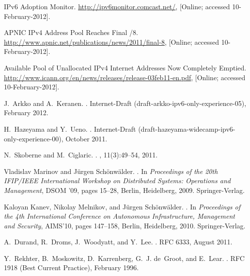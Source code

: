 \documentclass{llncs}
\begin{document}

\begin{thebibliography}{10}

{IPv6 Adoption Monitor}.
\newblock \url{http://ipv6monitor.comcast.net/}, [Online; accessed
  10-February-2012].

{APNIC IPv4 Address Pool Reaches Final /8}.
\newblock \url{http://www.apnic.net/publications/news/2011/final-8}, [Online;
  accessed 10-February-2012].

{Available Pool of Unallocated IPv4 Internet Addresses Now Completely Emptied}.
\newblock \url{http://www.icann.org/en/news/releases/release-03feb11-en.pdf},
  [Online; accessed 10-February-2012].

J.~Arkko and A.~Keranen.
.
\newblock Internet-Draft (draft-arkko-ipv6-only-experience-05), February 2012.

H.~Hazeyama and Y.~Ueno.
.
\newblock Internet-Draft (draft-hazeyama-widecamp-ipv6-only-experience-00),
  October 2011.

N.~Skoberne and M.~Ciglaric.
.
, 11(3):49--54,
  2011.

Vladislav Marinov and J{\"{u}}rgen Sch{\"{o}}nw{\"{a}}lder.
.
\newblock In {\em Proceedings of the 20th IFIP/IEEE International Workshop on
  Distributed Systems: Operations and Management}, DSOM '09, pages 15--28,
  Berlin, Heidelberg, 2009. Springer-Verlag.

Kaloyan Kanev, Nikolay Melnikov, and J{\"{u}}rgen Sch{\"{o}}nw{\"{a}}lder.
.
\newblock In {\em Proceedings of the 4th International Conference on Autonomous
  Infrastructure, Management and Security}, AIMS'10, pages 147--158, Berlin,
  Heidelberg, 2010. Springer-Verlag.

A.~Durand, R.~Droms, J.~Woodyatt, and Y.~Lee.
.
\newblock RFC 6333, August 2011.

Y.~Rekhter, B.~Moskowitz, D.~Karrenberg, G.~J. de~Groot, and E.~Lear.
.
\newblock RFC 1918 (Best Current Practice), February 1996.


\end{thebibliography}
\end{document}
